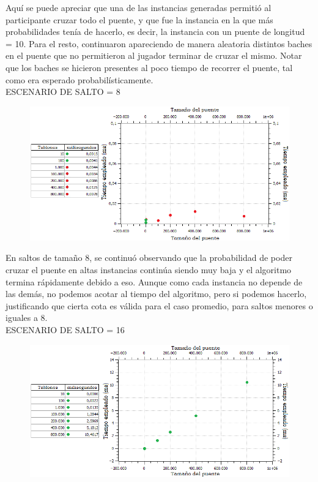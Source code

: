\documentclass[10pt,a4paper]{article}
\begin{document}
Aquí se puede apreciar que una de las instancias generadas permitió al participante cruzar todo el puente, y que fue la instancia en la que más probabilidades tenía de hacerlo, es decir, la instancia con un puente de longitud = 10. Para el resto, continuaron apareciendo de manera aleatoria distintos baches en el puente que no permitieron al jugador terminar de cruzar el mismo. Notar que los baches se hicieron presentes al poco tiempo de recorrer el puente, tal como era esperado probabilísticamente.\\

\newpage \indent ESCENARIO DE SALTO = 8
	\begin{figure}[h]
		\begin{center}
		   \includegraphics[scale=0.75]{casosDeTest/GRAFICOS/png/randoms/ej1_random_salto8.png}
		\end{center}
	\end{figure}

En saltos de tamaño 8, se continuó observando que la probabilidad de poder cruzar el puente en altas instancias continúa siendo muy baja y el algoritmo termina rápidamente debido a eso.  Aunque como cada instancia no depende de las demás, no podemos acotar al tiempo del algoritmo, pero si podemos hacerlo, justificando que cierta cota es válida para el caso promedio, para saltos menores o iguales a 8.\\

\indent ESCENARIO DE SALTO = 16
	\begin{figure}[h]
		\begin{center}
		   \includegraphics[scale=0.75]{casosDeTest/GRAFICOS/png/randoms/ej1_random_salto16.png}
		\end{center}
	\end{figure}
\end{document}
